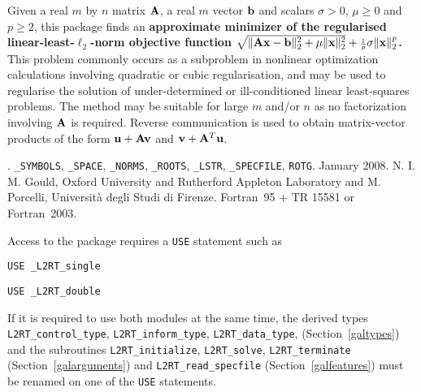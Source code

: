 \documentclass{galahad}
\newcommand{\packagename}{L2\-RT}
\newcommand{\fullpackagename}{\libraryname\_\packagename}
\begin{document}
\galheader


\galsummary
Given a real $m$ by $n$ matrix ${\mathbf{A}}$,
a real $m$ vector ${\mathbf{b}}$ and scalars $\sigma>0$, $\mu \geq 0$ and $p \geq 2$,
this package finds an
{\bf approximate minimizer of the regularised linear-least-$\ell_2$-norm
objective function
$\sqrt{\| {\mathbf{A}} {\mathbf{x}} - {\mathbf{b}}\|_2^2 + \mu \| {\mathbf{x}} \|_2^2}
 + {\scriptstyle \frac{1}{p}} \sigma \| {\mathbf{x}} \|_2^p$.}
This problem commonly occurs as a subproblem in nonlinear
optimization calculations involving quadratic or cubic regularisation,
and may be used to regularise the solution
of under-determined or ill-conditioned linear least-squares problems.
The method may be suitable for large $m$ and/or $n$ as no factorization
involving ${\mathbf{A}}$ is required. Reverse communication is used to obtain
matrix-vector products of the form ${\mathbf{u}} + {\mathbf{A}} {\mathbf{v}}$ and
${\mathbf{v}} + {\mathbf{A}}^T {\mathbf{u}}$.


\galattributes
\galversions{\tt  \fullpackagename\_single, \fullpackagename\_double}.
\galuses
{\tt \libraryname\_SY\-M\-BOLS},
{\tt \libraryname\_SPACE}, {\tt \libraryname\_\-NORMS},
{\tt \libraryname\_ROOTS}, {\tt \libraryname\_LSTR},
{\tt \libraryname\_SPECFILE},
{\tt *ROTG}.
\galdate January 2008.
\galorigin N. I. M. Gould, Oxford University and Rutherford Appleton Laboratory
 and M. Porcelli, Universit\`{a} degli Studi di Firenze.
\gallanguage Fortran~95 + TR 15581 or Fortran~2003.


\galhowto

Access to the package requires a {\tt USE} statement such as

\medskip{}

\hskip0.5in {\tt USE \fullpackagename\_single}

\medskip{}

\hskip0.5in {\tt USE  \fullpackagename\_double}

\medskip

\noindent
If it is required to use both modules at the same time, the derived types
{\tt \packagename\_control\_type}, {\tt \packagename\_inform\_type},
{\tt \packagename\_data\_type},
(Section~\ref{galtypes})
and the subroutines
{\tt \packagename\_initialize},
{\tt \packagename\_solve}, {\tt \packagename\_terminate}
(Section~\ref{galarguments})
and
{\tt \packagename\_read\_specfile}
(Section~\ref{galfeatures})
must be renamed on one of the {\tt USE} statements.
\end{document}
